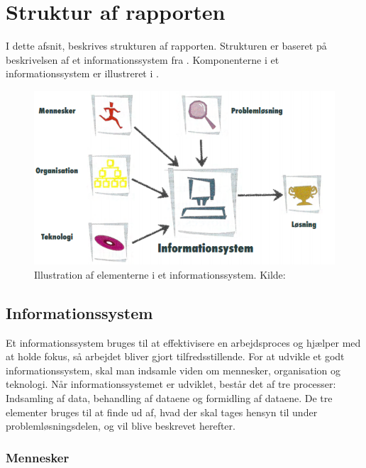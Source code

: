 \chapter{Struktur af rapporten}\label{chap:struktur-af-problemanalyse}

I dette afsnit, beskrives strukturen af rapporten.
Strukturen er baseret på beskrivelsen af et informationssystem fra \citet{Laudon1999}.
Komponenterne i et informationssystem er illustreret i .

\begin{figure}[htbp]
  \centering
  \includegraphics{images/kontekstmodel/metode.png}
  \caption[Metode for Kontekstmodellen]{Illustration af elementerne i et informationssystem. Kilde:
  \protect\citet{Laudon1999}}
  \label{fig:kontekstmodel}
\end{figure}


\section{Informationssystem}\label{sec:Informationssystem}

Et informationssystem bruges til at effektivisere en arbejdsproces og hjælper med at holde fokus, så arbejdet bliver gjort tilfredsstillende. 
For at udvikle et godt informationssystem, skal man indsamle viden om mennesker, organisation og teknologi. 
Når informationssystemet er udviklet, består det af tre processer: Indsamling af data, behandling af dataene og formidling af dataene. 
De tre elementer bruges til at finde ud af, hvad der skal tages hensyn til under problemløsningsdelen, og vil blive beskrevet herefter.

\subsection{Mennesker}\label{subsec:mennesker}

